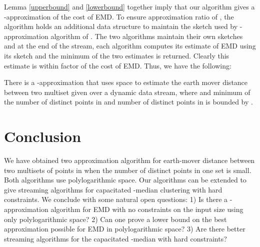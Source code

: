 \documentclass[oribibl]{llncs}
\begin{document}
Lemma \ref{upperbound} and \ref{lowerbound} together imply that our algorithm
gives a -approximation of the cost of EMD.
To ensure approximation ratio of , 
the algorithm holds an additional
data structure to maintain the sketch used by 
-approximation algorithm of \cite{ind04}. 
The two algorithms
maintain their own sketches and at the end of the stream, each
algorithm computes its estimate of EMD using its sketch and the minimum
of the two estimates is returned. Clearly this estimate is within 
 factor of the cost of EMD.
Thus, we have the following:

\begin{theorem}
There is a -approximation that uses 
 space to estimate the                                     
earth mover distance between two multiset  given over
a dynamic data stream, where  and minimum of the number of
distinct points in  and number of distinct points in  is bounded by . 
\end{theorem}

\section{Conclusion}\label{conclude}
We have obtained two approximation algorithm for earth-mover distance
between two multisets of points in  when the number of
distinct points in one set is small. Both algorithms use polylogarithmic space.
Our algorithms can be extended to give streaming algorithms for
capacitated -median clustering with hard constraints.
We conclude with some natural open questions: 1) Is there a -approximation
algorithm for EMD with no constraints on the input size using only polylogarithmic space?
2) Can one prove a lower bound on the best approximation possible for EMD
in polylogarithmic space?
3) Are there better streaming algorithms for the capacitated -median
with hard constraints? 



\appendix
\end{document}
